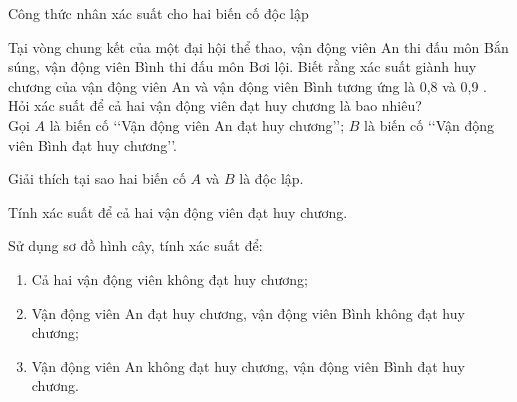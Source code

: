 \begin{dang}{Công thức nhân xác suất cho hai biến cố độc lập}
\end{dang}
\begin{vd}%
	Tại vòng chung kết của một đại hội thể thao, vận động viên An thi đấu môn Bắn súng, vận động viên Bình thi đấu môn Bơi lội.
	Biết rằng xác suất giành huy chương của vận động viên An và vận động viên Bình tương ứng là 0,8 và 0,9 . Hỏi xác suất để cả hai vận động viên đạt huy chương là bao nhiêu?
	\\Gọi $A$ là biến cố \lq\lq Vận động viên An đạt huy chương\rq\rq; $B$ là biến cố \lq\lq Vận động viên Bình đạt huy chương\rq\rq.
	\begin{enumEX}{1}
	\item Giải thích tại sao hai biến cố $A$ và $B$ là độc lập.
	\item Tính xác suất để cả hai vận động viên đạt huy chương.
	\item Sử dụng sơ đồ hình cây, tính xác suất để:
	\begin{enumerate}[--]
	\item Cả hai vận động viên không đạt huy chương;
	\item Vận động viên An đạt huy chương, vận động viên Bình không đạt huy chương;
	\item Vận động viên An không đạt huy chương, vận động viên Bình đạt huy chương.
	\end{enumerate}
	\end{enumEX}
\end{vd}

